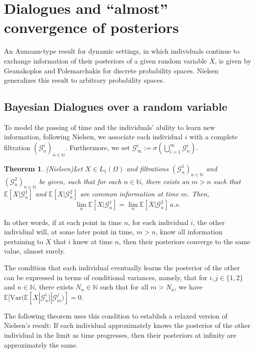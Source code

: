 \documentclass[a4paper, 10pt]{article}
\newtheorem{theorem}{Theorem}
\numberwithin{theorem}{section}
\theoremstyle{definition}
\newcommand{\N}{\mathbb{N}}
\newcommand{\E}{\mathbb{E}}
\newcommand{\G}{\mathcal{G}}
\newcommand{\Var}{\mathrm{Var}}
\begin{document}
\boldmath
\section{Dialogues and ``almost'' convergence of posteriors}
\unboldmath


An Aumann-type result for dynamic settings, in which individuals continue to exchange information of their posteriors of a given random variable $X$, is given by Geanakoplos and Polemarchakis \cite{GePo82} for discrete probability spaces. Nielsen \cite{Ni84} generalizes this result to arbitrary probability spaces.


\subsection{Bayesian Dialogues over a random variable}

 To model the passing of time and the individuals' ability to learn new information, following Nielsen, we associate each individual $i$ with a complete filtration $(\G^i_n)_{n\in \N}$. Furthermore, we set $\G^i_\infty:= \sigma(\bigcup_{i=1}^\infty \G^i_n)$.


\begin{theorem}(Nielsen)\label{theo:dialog_nielsen}
		Let $X\in L_1(\Omega)$ and filtrations $(\G_n^1)_{n \in \N}$ and $(\G_n^2)_{n\in \N}$ be given, such that for each $n\in \N$, there exists an $m>n$ such that $\E[X|\G^1_n]$ and  $\E[X|\G^2_n]$  are common information at time $m$. Then, $$\lim_n \E[X|\G_n^1] = \lim_n \E[X|\G_n^2]  \, a.s.$$
\end{theorem}

In other words, if at each point in time $n$, for each individual $i$, the other individual will, at some later point in time,  $m>n$, know all information pertaining to $X$ that $i$ knew at time $n$, then their posteriors converge to the same value, almost surely.


The condition that each individual eventually learns the posterior of the other can be expressed in terms of conditional variances, namely, that for $i,j \in \{1,2\}$ and $n \in \N$, there exists $N_n \in \N$ such that for all $m >N_n$, we have $\E[\Var(\E[X|\G^i_n]|\G^j_m)]=0.$

The following theorem uses this condition to establish a relaxed version of Nielsen's result: If each individual approximately knows the posterior of the other individual in the limit as time progresses, then their posteriors at infinity are approximately the same.
\end{document}
